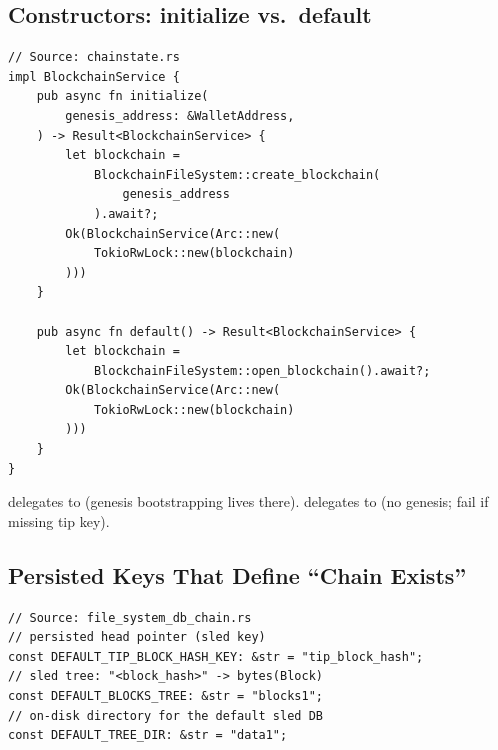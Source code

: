 \subsection{Constructors: initialize vs.\ default}
\label{sec:ch09-3-constructors}

\begin{listing}[H]
\caption{ constructor entry points}
\label{lst:ch09-3-8}
\begin{verbatim}
// Source: chainstate.rs
impl BlockchainService {
    pub async fn initialize(
        genesis_address: &WalletAddress,
    ) -> Result<BlockchainService> {
        let blockchain =
            BlockchainFileSystem::create_blockchain(
                genesis_address
            ).await?;
        Ok(BlockchainService(Arc::new(
            TokioRwLock::new(blockchain)
        )))
    }

    pub async fn default() -> Result<BlockchainService> {
        let blockchain =
            BlockchainFileSystem::open_blockchain().await?;
        Ok(BlockchainService(Arc::new(
            TokioRwLock::new(blockchain)
        )))
    }
}
\end{verbatim}
\end{listing}

\begin{notebox}
 delegates to  (genesis bootstrapping lives there).  delegates to  (no genesis; fail if missing tip key).
\end{notebox}

\subsection{Persisted Keys That Define ``Chain Exists''}
\label{sec:ch09-3-persisted-keys}

\begin{listing}[H]
\caption{Storage constants for tip pointer and blocks}
\label{lst:ch09-3-9}
\begin{verbatim}
// Source: file_system_db_chain.rs
// persisted head pointer (sled key)
const DEFAULT_TIP_BLOCK_HASH_KEY: &str = "tip_block_hash";
// sled tree: "<block_hash>" -> bytes(Block)
const DEFAULT_BLOCKS_TREE: &str = "blocks1";
// on-disk directory for the default sled DB
const DEFAULT_TREE_DIR: &str = "data1";
\end{verbatim}
\end{listing}

